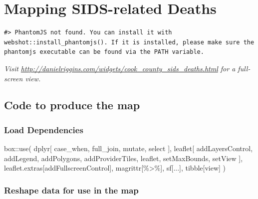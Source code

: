 \documentclass[
]{book}
\newenvironment{Shaded}{\begin{snugshade}}{\end{snugshade}}
\newcommand{\AttributeTok}[1]{\textcolor[rgb]{0.77,0.63,0.00}{#1}}
\newcommand{\FunctionTok}[1]{\textcolor[rgb]{0.00,0.00,0.00}{#1}}
\newcommand{\NormalTok}[1]{#1}
\newcommand{\SpecialCharTok}[1]{\textcolor[rgb]{0.00,0.00,0.00}{#1}}
\newcommand{\StringTok}[1]{\textcolor[rgb]{0.31,0.60,0.02}{#1}}
\begin{document}
\hypertarget{mapping-sids-related-deaths}{%
\chapter{Mapping SIDS-related Deaths}\label{mapping-sids-related-deaths}}

\begin{verbatim}
#> PhantomJS not found. You can install it with webshot::install_phantomjs(). If it is installed, please make sure the phantomjs executable can be found via the PATH variable.
\end{verbatim}

\emph{Visit \url{http://danielriggins.com/widgets/cook_county_sids_deaths.html} for a full-screen view.}

\hypertarget{code-to-produce-the-map}{%
\section{Code to produce the map}\label{code-to-produce-the-map}}

\hypertarget{load-dependencies}{%
\subsection{Load Dependencies}\label{load-dependencies}}

\begin{Shaded}
\begin{Highlighting}[]
\NormalTok{box}\SpecialCharTok{::}\FunctionTok{use}\NormalTok{(}
\NormalTok{    dplyr[}
\NormalTok{        case\_when,}
\NormalTok{        full\_join,}
\NormalTok{        mutate,}
\NormalTok{        select}
\NormalTok{    ],}
\NormalTok{    leaflet[}
\NormalTok{        addLayersControl,}
\NormalTok{        addLegend,}
\NormalTok{        addPolygons,}
\NormalTok{        addProviderTiles, }
\NormalTok{        leaflet, }
\NormalTok{        setMaxBounds, }
\NormalTok{        setView}
\NormalTok{    ],}
\NormalTok{    leaflet.extras[addFullscreenControl],}
\NormalTok{    magrittr[}\StringTok{\textasciigrave{}}\AttributeTok{\%\textgreater{}\%}\StringTok{\textasciigrave{}}\NormalTok{],}
\NormalTok{    sf[...],}
\NormalTok{    tibble[view]}
\NormalTok{)}
\end{Highlighting}
\end{Shaded}

\hypertarget{reshape-data-for-use-in-the-map}{%
\subsection{Reshape data for use in the map}\label{reshape-data-for-use-in-the-map}}
\end{document}
